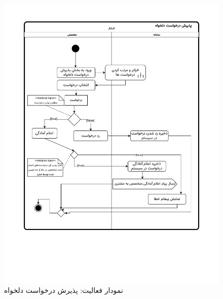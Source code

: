 \begin{figure}[ht!]
	\centering
	\includegraphics[scale=0.8]{figs/OOD-activity-arbitraryreq.pdf}
	\caption{نمودار فعالیت: پذیرش درخواست دلخواه}
\end{figure}
\FloatBarrier
\newpage

